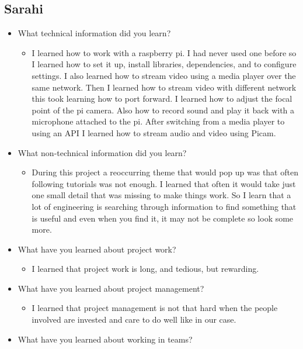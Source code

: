 \documentclass[onecolumn, draftclsnofoot,10pt, compsoc]{IEEEtran}
\begin{document}
    \subsection{Sarahi}
    \begin{itemize}
        \item What technical information did you learn?
        \begin{itemize}
            \item I learned how to work with a raspberry pi. I had never used one before so I learned how to set it up, install libraries, dependencies, and to configure settings. I also learned how to stream video using a media player over the same network. Then I learned how to stream video with different network this took learning how to port forward. I learned how to adjust the focal point of the pi camera. Also how to record sound and play it back with a microphone attached to the pi. After switching from a media player to using an API I learned how to stream audio and video using Picam.
        \end{itemize}
        \item What non-technical information did you learn?
        \begin{itemize}
            \item During this project a reoccurring theme that would pop up was that often following tutorials was not enough. I learned that often it would take just one small detail that was missing to make things work. So I learn that a lot of engineering is searching through information to find something that is useful and even when you find it, it may not be complete so look some more.
        \end{itemize}
        \item What have you learned about project work?
        \begin{itemize}
            \item I learned that project work is long, and tedious, but rewarding.
        \end{itemize}
        \item What have you learned about project management?
        \begin{itemize}
            \item I learned that project management is not that hard when the people involved are invested and care to do well like in our case.
        \end{itemize}
        \item What have you learned about working in teams?

\end{itemize}
\end{document}
